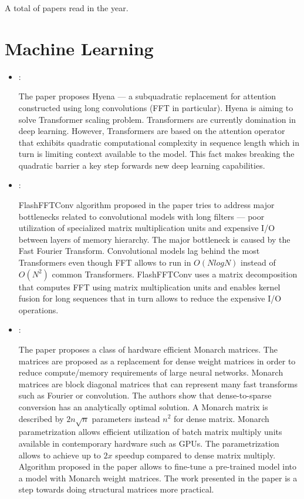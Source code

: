 



A total of  papers read in the year.


\section*{Machine Learning}
\begin{itemize}
    \item \cite{Poli:Hyena:2023}:

    The paper proposes Hyena --- a subquadratic replacement for attention constructed using long convolutions (FFT in particular). Hyena is aiming to solve Transformer scaling problem. Transformers are currently domination in deep learning. However, Transformers are based on the attention operator that exhibits quadratic computational complexity in sequence length which in turn is limiting context available to the model. This fact makes breaking the quadratic barrier a key step forwards new deep learning capabilities.

    \item \cite{Fu:FlashFFTConv:2024}:

    FlashFFTConv algorithm proposed in the paper tries to address major bottlenecks related to convolutional models with long filters --- poor utilization of specialized matrix multiplication units and expensive I/O between layers of memory hierarchy. The major bottleneck is caused by the Fast Fourier Transform. Convolutional models lag behind the most Transformers even though FFT allows to run in $O(N log N)$ instead of  $O(N^2)$ common Transformers. FlashFFTConv uses a matrix decomposition that computes FFT using matrix multiplication units and enables kernel fusion for long sequences that in turn allows to reduce the expensive I/O operations.

    \item \cite{Dao:Monarch:2022}:

    The paper proposes a class of hardware efficient Monarch matrices. The matrices are proposed as a replacement for dense weight matrices in order to reduce compute/memory requirements of large neural networks. Monarch matrices are block diagonal matrices that can represent many fast transforms such as Fourier or convolution. The authors show that dense-to-sparse conversion has an analytically optimal solution. A Monarch matrix is described by $2n\sqrt{n}$ parameters instead $n^2$ for dense matrix. Monarch parametrization allows efficient utilization of batch matrix multiply units available in contemporary hardware such as GPUs. The parametrization allows to achieve up to $2x$ speedup compared to dense matrix multiply. Algorithm proposed in the paper allows to fine-tune a pre-trained model into a model with Monarch weight matrices. The work presented in the paper is a step towards doing structural matrices more practical.


\end{itemize}

